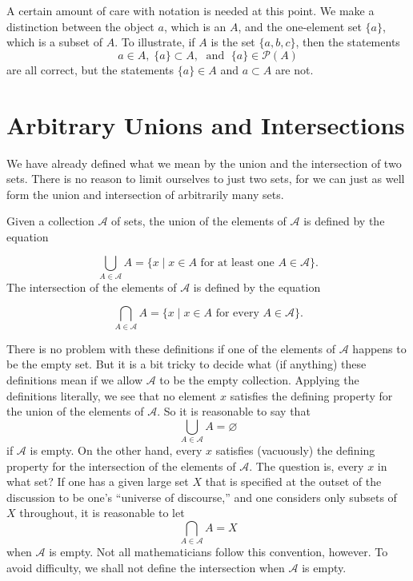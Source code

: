 A certain amount of care with notation is needed at this point. We make a distinction between 
the object \(a\), which is an  \(A\), and the one-element set \(\{ a\}\), 
which is a subset of \(A\). To illustrate, if \(A\) is the set \(\{ a,b,c\}\), then the statements
\[
a \in A,\;\{ a\} \subset A,\;\text{ and }\;\{ a\} \in \mathcal{P}(A)
\]
are all correct, but the statements \(\{ a\} \in A\) and \(a \subset A\) are not.

\section*{Arbitrary Unions and Intersections}

We have already defined what we mean by the union and the intersection of two sets. There is 
no reason to limit ourselves to just two sets, for we can just as well form the union and intersection 
of arbitrarily many sets.

Given a collection \(\mathcal{A}\) of sets, the union of the elements 
of \(\mathcal{A}\) is defined by the equation

\[
\mathop{\bigcup }\limits_{{A \in \mathcal{A}}}A = \{ x \mid x \in A\text{ for at least one }A \in \mathcal{A}\}.
\]
The intersection of the elements of \(\mathcal{A}\) is defined by the equation

\[
\mathop{\bigcap }\limits_{{A \in \mathcal{A}}}A = \{ x \mid x \in A\text{ for every }A \in \mathcal{A}\}.
\]
\begin{centeredblock*}
 There is no problem with these definitions if one of the elements of \(\mathcal{A}\) 
 happens to be the empty set. But it is a bit tricky to decide what (if anything) these 
 definitions mean if we allow \(\mathcal{A}\) to be the empty collection. Applying the 
 definitions literally, we see that no element \(x\) satisfies the defining property for 
 the union of the elements of \(\mathcal{A}\). So it is reasonable to say that
 \[
 \mathop{\bigcup }\limits_{{A \in \mathcal{A}}}A = \varnothing
 \]
 if \(\mathcal{A}\) is empty. On the other hand, every \(x\) satisfies (vacuously) the defining 
 property for the intersection of the elements of \(\mathcal{A}\). The question is, every \(x\) 
 in what set? If one has a given large set \(X\) that is specified at the outset of the discussion 
 to be one's ``universe of discourse,'' and one considers only subsets of \(X\) throughout, 
 it is reasonable to let
 \[
 \mathop{\bigcap }\limits_{{A \in \mathcal{A}}}A = X
 \]
 when \(\mathcal{A}\) is empty. Not all mathematicians follow this convention, however. 
 To avoid difficulty, we shall not define the intersection when \(\mathcal{A}\) is empty.
\end{centeredblock*}

